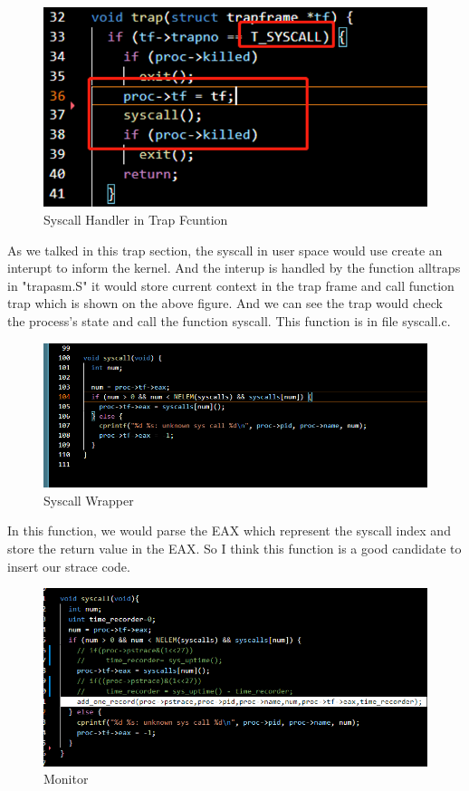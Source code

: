 \documentclass[11pt,oneside,a4paper]{article}
\begin{document}
\begin{figure}[H]
    \includegraphics[width=4.75in]{1-1.png}
    \centering
    \caption{Syscall Handler in Trap Fcuntion}
\end{figure}

As we talked in this trap section, the syscall in user space would use create an
interupt to inform the kernel. And the interup is handled by the function alltraps 
in "trapasm.S" it would store current context in the trap frame and call function 
trap which is shown on the above figure. And we can see the trap would check the 
process's state and call the function syscall. This function is in file syscall.c.

\begin{figure}[H]
    \includegraphics[width=4.75in]{1-2.png}
    \centering
    \caption{Syscall Wrapper}
\end{figure}

In this function, we would parse the EAX which represent the syscall index and 
store the return value in the EAX. So I think this function is a good candidate
to insert our strace code. 

\begin{figure}[H]
    \includegraphics[width=4.75in]{1-7.png}
    \centering
    \caption{Monitor}
\end{figure}
\end{document}

